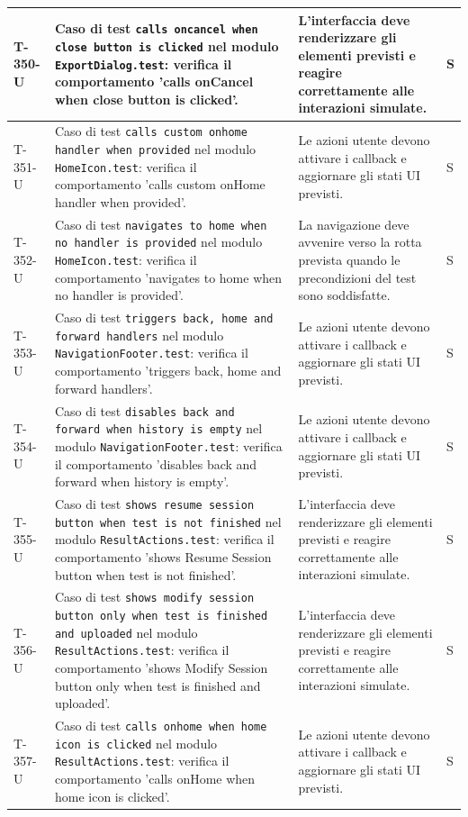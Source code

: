 \documentclass[a4paper,12pt]{article}
\begin{document}
{{\begin{longtable}{|>{\RaggedRight\arraybackslash}p{1.55cm}|>{\RaggedRight\arraybackslash}p{8.0cm}|>{\RaggedRight\arraybackslash}p{4.6cm}|>{\RaggedRight\arraybackslash}p{1.2cm}|}
        \hline
        T-350-U & Caso di test \texttt{calls oncancel when close button is clicked} nel modulo \texttt{ExportDialog.test}: verifica il comportamento 'calls onCancel when close button is clicked'. & L'interfaccia deve renderizzare gli elementi previsti e reagire correttamente alle interazioni simulate. & S \\
        \hline
        T-351-U & Caso di test \texttt{calls custom onhome handler when provided} nel modulo \texttt{HomeIcon.test}: verifica il comportamento 'calls custom onHome handler when provided'. & Le azioni utente devono attivare i callback e aggiornare gli stati UI previsti. & S \\
        \hline
        T-352-U & Caso di test \texttt{navigates to home when no handler is provided} nel modulo \texttt{HomeIcon.test}: verifica il comportamento 'navigates to home when no handler is provided'. & La navigazione deve avvenire verso la rotta prevista quando le precondizioni del test sono soddisfatte. & S \\
        \hline
        T-353-U & Caso di test \texttt{triggers back, home and forward handlers} nel modulo \texttt{NavigationFooter.test}: verifica il comportamento 'triggers back, home and forward handlers'. & Le azioni utente devono attivare i callback e aggiornare gli stati UI previsti. & S \\
        \hline
        T-354-U & Caso di test \texttt{disables back and forward when history is empty} nel modulo \texttt{NavigationFooter.test}: verifica il comportamento 'disables back and forward when history is empty'. & Le azioni utente devono attivare i callback e aggiornare gli stati UI previsti. & S \\
        \hline
        T-355-U & Caso di test \texttt{shows resume session button when test is not finished} nel modulo \texttt{ResultActions.test}: verifica il comportamento 'shows Resume Session button when test is not finished'. & L'interfaccia deve renderizzare gli elementi previsti e reagire correttamente alle interazioni simulate. & S \\
        \hline
        T-356-U & Caso di test \texttt{shows modify session button only when test is finished and uploaded} nel modulo \texttt{ResultActions.test}: verifica il comportamento 'shows Modify Session button only when test is finished and uploaded'. & L'interfaccia deve renderizzare gli elementi previsti e reagire correttamente alle interazioni simulate. & S \\
        \hline
        T-357-U & Caso di test \texttt{calls onhome when home icon is clicked} nel modulo \texttt{ResultActions.test}: verifica il comportamento 'calls onHome when home icon is clicked'. & Le azioni utente devono attivare i callback e aggiornare gli stati UI previsti. & S \\

\end{longtable}}}
\end{document}
